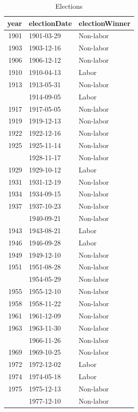 \documentclass[12pt,]{article}
\theoremstyle{definition}
\theoremstyle{definition}
\theoremstyle{definition}
\theoremstyle{remark}
\begin{document}
\begin{table}

\caption{\label{tab:elections}Elections}
\centering
\fontsize{8}{10}\selectfont
\begin{tabular}[t]{rll}
\toprule
year & electionDate & electionWinner\\
\midrule
1901 & 1901-03-29 & Non-labor\\
1903 & 1903-12-16 & Non-labor\\
1906 & 1906-12-12 & Non-labor\\
1910 & 1910-04-13 & Labor\\
1913 & 1913-05-31 & Non-labor\\
\addlinespace
1914 & 1914-09-05 & Labor\\
1917 & 1917-05-05 & Non-labor\\
1919 & 1919-12-13 & Non-labor\\
1922 & 1922-12-16 & Non-labor\\
1925 & 1925-11-14 & Non-labor\\
\addlinespace
1928 & 1928-11-17 & Non-labor\\
1929 & 1929-10-12 & Labor\\
1931 & 1931-12-19 & Non-labor\\
1934 & 1934-09-15 & Non-labor\\
1937 & 1937-10-23 & Non-labor\\
\addlinespace
1940 & 1940-09-21 & Non-labor\\
1943 & 1943-08-21 & Labor\\
1946 & 1946-09-28 & Labor\\
1949 & 1949-12-10 & Non-labor\\
1951 & 1951-08-28 & Non-labor\\
\addlinespace
1954 & 1954-05-29 & Non-labor\\
1955 & 1955-12-10 & Non-labor\\
1958 & 1958-11-22 & Non-labor\\
1961 & 1961-12-09 & Non-labor\\
1963 & 1963-11-30 & Non-labor\\
\addlinespace
1966 & 1966-11-26 & Non-labor\\
1969 & 1969-10-25 & Non-labor\\
1972 & 1972-12-02 & Labor\\
1974 & 1974-05-18 & Labor\\
1975 & 1975-12-13 & Non-labor\\
\addlinespace
1977 & 1977-12-10 & Non-labor\\

\end{tabular}
\end{table}
\end{document}
